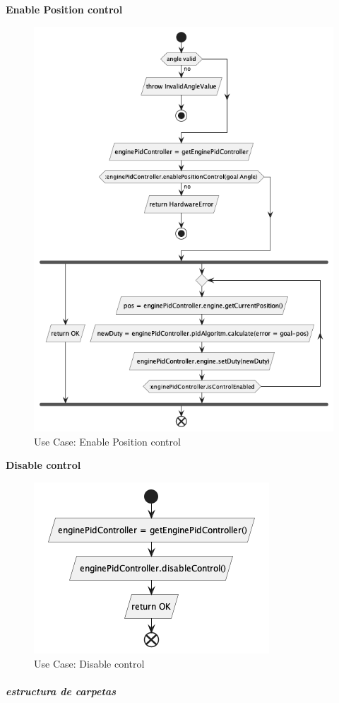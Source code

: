\textbf{Enable Position control}

\begin{figure}[H]
    \centering
    \includegraphics[height=0.4\textheight]{./part/Proyecto_ejecutivo/memoria_descriptiva/descripcionDelProyecto/control/uml/enablePositionControl}
    \caption{Use Case: Enable Position control}\label{fig:Use Case- Enable Position control}
\end{figure}

\textbf{Disable control}

\begin{figure}[H]
    \centering
    \includegraphics[height=0.2\textheight]{./part/Proyecto_ejecutivo/memoria_descriptiva/descripcionDelProyecto/control/uml/disableControl}
    \caption{Use Case: Disable control}\label{fig:Use Case- Disable control}
\end{figure}

\subparagraph{estructura de carpetas}







